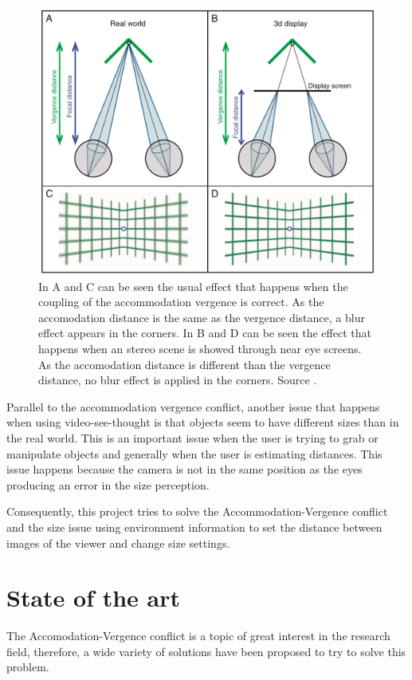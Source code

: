 \documentclass[10pt,a4paper,twocolumn,twoside]{article}
\begin{document}
	\begin{figure}
		\centering
		\includegraphics[width=1\linewidth]{img/vergencia.png}
		\caption{ In A and C can be seen the usual effect that happens when the coupling of the accommodation vergence is correct. As the accomodation distance is the same as the vergence distance, a blur effect appears in the corners. In B and D can be seen the effect that happens when an stereo scene is showed through near eye screens. As the accomodation distance is different than the vergence distance, no blur effect is applied in the corners. Source \cite{vergenceDisconfort}.}
		\label{fig:vergence}
	\end{figure}
	
	Parallel to the accommodation vergence conflict, another issue that happens when using video-see-thought is that objects seem to have different sizes than in the real world. This is an important issue when the user is trying to grab or manipulate objects and generally when the user is estimating distances. This issue happens because the camera is not in the same position as the eyes producing an error in the size perception.
	
	Consequently, this project tries to solve the Accommodation-Vergence conflict and the size issue using environment information to set the distance between images of the viewer and change size settings.
	
		
	\section{State of the art}
	\label{sec:art}
	The Accomodation-Vergence conflict is a topic of great interest in the research field, therefore, a wide variety of  solutions have been proposed to try to solve this problem. 
	
\end{document}
